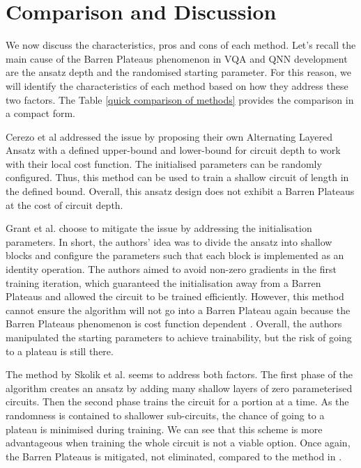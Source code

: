 \section{Comparison and Discussion}
We now discuss the characteristics, pros and cons of each method.
Let's recall the main cause of the Barren Plateaus phenomenon in VQA and QNN development are the ansatz depth and the randomised starting parameter.
For this reason, we will identify the characteristics of each method based on how they address these two factors.
The Table \ref{quick comparison of methods} provides the comparison in a compact form.

Cerezo et al  \cite{cerezoCostFunctionDependent2021} addressed the issue by proposing their own Alternating Layered Ansatz with a defined upper-bound and lower-bound for circuit depth to work with their local cost function. 
The initialised parameters can be randomly configured.
Thus, this method can be used to train a shallow circuit of length in the defined bound. 
Overall, this ansatz design does not exhibit a Barren Plateaus at the cost of circuit depth.

Grant et al. \cite{grantInitializationStrategyAddressing2019} choose to mitigate the issue by addressing the initialisation parameters. 
In short, the authors' idea was to divide the ansatz into shallow blocks and configure the parameters such that each block is implemented as an identity operation.
The authors aimed to avoid non-zero gradients in the first training iteration, which guaranteed the initialisation away from a Barren Plateaus and allowed the circuit to be trained efficiently.
However, this method cannot ensure the algorithm will not go into a Barren Plateau again because the Barren Plateaus phenomenon is cost function dependent \cite{cerezoCostFunctionDependent2021}.
Overall, the authors manipulated the starting parameters to achieve trainability, but the risk of going to a plateau is still there.

The method by Skolik et al. \cite{skolikLayerwiseLearningQuantum2021} seems to address both factors.
The first phase of the algorithm creates an ansatz by adding many shallow layers of zero parameterised circuits. 
Then the second phase trains the circuit for a portion at a time.
As the randomness is contained to shallower sub-circuits, the chance of going to a plateau is minimised during training.
We can see that this scheme is more advantageous when training the whole circuit is not a viable option. 
Once again, the Barren Plateaus is mitigated, not eliminated, compared to the method in \cite{cerezoCostFunctionDependent2021}.


